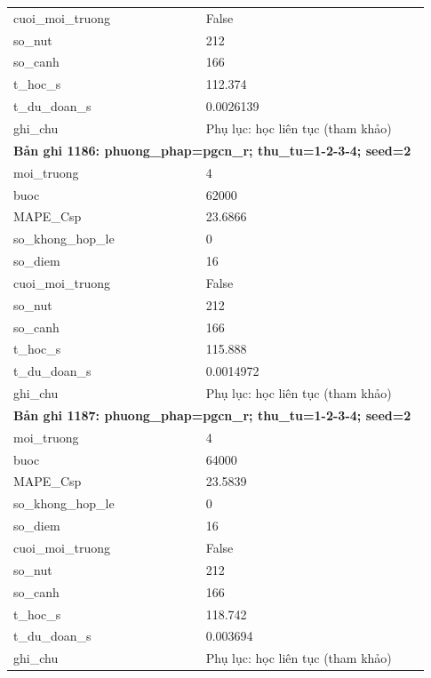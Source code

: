 \begin{longtable}{p{0.43\linewidth}p{0.50\linewidth}}
cuoi\_\allowbreak moi\_\allowbreak truong & False \\
so\_\allowbreak nut & 212 \\
so\_\allowbreak canh & 166 \\
t\_\allowbreak hoc\_\allowbreak s & 112.374 \\
t\_\allowbreak du\_\allowbreak doan\_\allowbreak s & 0.0026139 \\
ghi\_\allowbreak chu & Phụ lục: học liên tục (tham khảo) \\
\midrule
\multicolumn{2}{p{0.95\linewidth}}{\textbf{Bản ghi 1186: phuong\_phap=pgcn\_r; thu\_tu=1-2-3-4; seed=2}} \\
moi\_\allowbreak truong & 4 \\
buoc & 62000 \\
MAPE\_\allowbreak Csp & 23.6866 \\
so\_\allowbreak khong\_\allowbreak hop\_\allowbreak le & 0 \\
so\_\allowbreak diem & 16 \\
cuoi\_\allowbreak moi\_\allowbreak truong & False \\
so\_\allowbreak nut & 212 \\
so\_\allowbreak canh & 166 \\
t\_\allowbreak hoc\_\allowbreak s & 115.888 \\
t\_\allowbreak du\_\allowbreak doan\_\allowbreak s & 0.0014972 \\
ghi\_\allowbreak chu & Phụ lục: học liên tục (tham khảo) \\
\midrule
\multicolumn{2}{p{0.95\linewidth}}{\textbf{Bản ghi 1187: phuong\_phap=pgcn\_r; thu\_tu=1-2-3-4; seed=2}} \\
moi\_\allowbreak truong & 4 \\
buoc & 64000 \\
MAPE\_\allowbreak Csp & 23.5839 \\
so\_\allowbreak khong\_\allowbreak hop\_\allowbreak le & 0 \\
so\_\allowbreak diem & 16 \\
cuoi\_\allowbreak moi\_\allowbreak truong & False \\
so\_\allowbreak nut & 212 \\
so\_\allowbreak canh & 166 \\
t\_\allowbreak hoc\_\allowbreak s & 118.742 \\
t\_\allowbreak du\_\allowbreak doan\_\allowbreak s & 0.003694 \\
ghi\_\allowbreak chu & Phụ lục: học liên tục (tham khảo) \\

\end{longtable}
